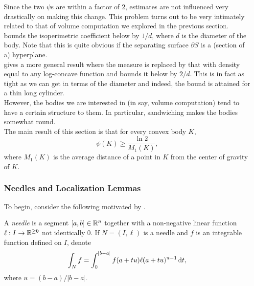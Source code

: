 Since the two $\psi$s are within a factor of $2$, estimates are not influenced very drastically on making this change. This problem turns out to be very intimately related to that of volume computation we explored in the previous section.\\
\cite{lovasz-simonovits-mixing-rate-isoperimetric} bounds the isoperimetric coefficient below by $1/d$, where $d$ is the diameter of the body. Note that this is quite obvious if the separating surface $\partial S$ is a (section of a) hyperplane.\\
\cite{applegate-kannan-cube-sandwich} gives a more general result where the measure is replaced by that with density equal to any log-concave function and bounds it below by $2/d$. This is in fact as tight as we can get in terms of the diameter and indeed, the bound is attained for a thin long cylinder.\\
However, the bodies we are interested in (in say, volume computation) tend to have a certain structure to them. In particular, sandwiching makes the bodies somewhat round.\\
The main result of this section is that for every convex body $K$,
\[ \psi(K) \geq \frac{\ln 2}{M_1(K)}, \]
where $M_1(K)$ is the average distance of a point in $K$ from the center of gravity of $K$. 

\subsubsection{Needles and Localization Lemmas}
\label{sec: 5.1.2}

To begin, consider the following motivated by .

\begin{definition}
	A \textit{needle} is a segment $[a,b]\in\mathbb{R}^n$ together with a non-negative linear function $\ell:I\to\mathbb{R}^{\geq 0}$ not identically $0$. If $N=(I,\ell)$ is a needle and $f$ is an integrable function defined on $I$, denote
	\[ \int_N f = \int_{0}^{|b-a|} f(a+tu)\ell(a+tu)^{n-1} \operatorname{d}\!{t}, \]
	where $u=(b-a)/|b-a|$.
\end{definition}

